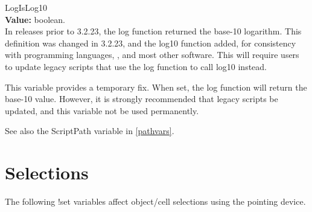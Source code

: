 \begin{description}
\item{\et LogIsLog10}\\
{\bf Value:} boolean.\\
In {\Xic} releases prior to 3.2.23, the {\vt log} function returned
the base-10 logarithm.  This definition was changed in 3.2.23, and
the {\vt log10} function added, for consistency with programming
languages, {\WRspice}, and most other software.  This will require
users to update legacy scripts that use the {\vt log} function to
call {\vt log10} instead.

This variable provides a temporary fix.  When set, the {\vt log}
function will return the base-10 value.  However, it is strongly
recommended that legacy scripts be updated, and this variable not be
used permanently.
\end{description}

See also the {\et ScriptPath} variable in \ref{pathvars}.


\section{Selections}

The following {\cb !set} variables affect object/cell selections using
the pointing device.

